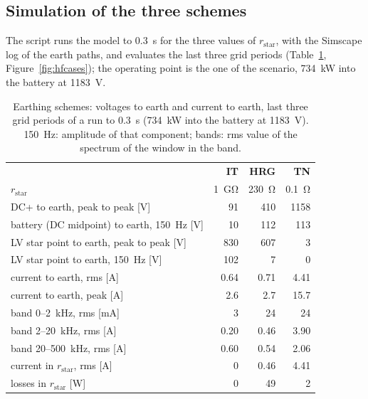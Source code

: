 \documentclass[11pt,a4paper]{scrartcl}
\newcommand{\ped}[1]{_{\mathrm{#1}}}
\begin{document}
\begin{onehalfspace}
\subsection{Simulation of the three schemes}
\label{sec:hfsim}

The script  runs the model to \SI{0.3}{s} for the three values of $r\ped{star}$, with the Simscape log of the earth paths, and evaluates the last three grid periods (Table~\ref{tab:hfres}, Figure~\ref{fig:hfcases}); the operating point is the one of the scenario, \SI{734}{\kilo\watt} into the battery at \SI{1183}{V}.

\begin{table}[H]
	\centering
	\captionsetup{width=0.92\textwidth, font=small}
	\caption[Earthing schemes: simulation results.]{Earthing schemes: voltages to earth and current to earth, last three grid periods of a run to \SI{0.3}{s} (\SI{734}{\kilo\watt} into the battery at \SI{1183}{V}). \SI{150}{Hz}: amplitude of that component; bands: rms value of the spectrum of the window in the band.}
	\label{tab:hfres}
	\small
	\begin{tabular}{@{} l r r r @{}}
		\toprule
		 & \textbf{IT} & \textbf{HRG} & \textbf{TN} \\
		 $r\ped{star}$ & \SI{1}{\giga\ohm} & \SI{230}{\ohm} & \SI{0.1}{\ohm} \\
		\midrule
		DC+ to earth, peak to peak [V] & 91 & 410 & 1158 \\
		battery (DC midpoint) to earth, \SI{150}{Hz} [V] & 10 & 112 & 113 \\
		LV star point to earth, peak to peak [V] & 830 & 607 & 3 \\
		LV star point to earth, \SI{150}{Hz} [V] & 102 & 7 & 0 \\
		current to earth, rms [A] & 0.64 & 0.71 & 4.41 \\
		current to earth, peak [A] & 2.6 & 2.7 & 15.7 \\
		\quad band 0--\SI{2}{kHz}, rms [mA] & 3 & 24 & 24 \\
		\quad band 2--\SI{20}{kHz}, rms [A] & 0.20 & 0.46 & 3.90 \\
		\quad band 20--\SI{500}{kHz}, rms [A] & 0.60 & 0.54 & 2.06 \\
		current in $r\ped{star}$, rms [A] & 0 & 0.46 & 4.41 \\
		losses in $r\ped{star}$ [W] & 0 & 49 & 2 \\
		\bottomrule
	\end{tabular}
\end{table}


\end{onehalfspace}
\end{document}
